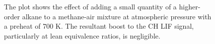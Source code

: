 \begin{figure}

\centering



\caption[- alkane-air flame results - III]{The plot shows the effect of adding a small quantity of a higher-order alkane to a methane-air mixture at atmospheric pressure with a preheat of 700 K. The resultant boost to the CH LIF signal, particularly at lean equivalence ratios, is negligible.}

\label{fig:c1c2c3}

\end{figure}

